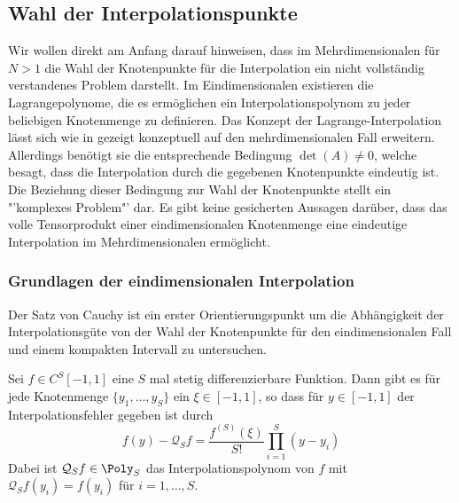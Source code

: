 \subsection{Wahl der Interpolationspunkte}
\label{chapter:interpolation_points}
Wir wollen direkt am Anfang darauf hinweisen, dass im Mehrdimensionalen für $N>1$ die Wahl der Knotenpunkte für die Interpolation ein nicht vollständig verstandenes Problem darstellt. Im Eindimensionalen existieren die Lagrangepolynome, die es ermöglichen ein Interpolationspolynom zu jeder beliebigen Knotenmenge zu definieren. Das Konzept der Lagrange-Interpolation lässt sich wie in \autocite{San07} gezeigt konzeptuell auf den mehrdimensionalen Fall erweitern. Allerdings benötigt sie die entsprechende Bedingung $\det(A)\neq 0$, welche besagt, dass die Interpolation durch die gegebenen Knotenpunkte eindeutig ist. Die Beziehung dieser Bedingung zur Wahl der Knotenpunkte stellt ein "'komplexes Problem"' dar. Es gibt keine gesicherten Aussagen darüber, dass das volle Tensorprodukt einer eindimensionalen Knotenmenge eine eindeutige Interpolation im Mehrdimensionalen ermöglicht.
\subsubsection*{Grundlagen der eindimensionalen Interpolation}
Der Satz von Cauchy ist ein erster Orientierungspunkt um die Abhängigkeit der Interpolationsgüte von der Wahl der Knotenpunkte für den eindimensionalen Fall und einem kompakten Intervall zu untersuchen.
\begin{maththeorem}[Cauchy]
Sei $f\in C^{S}[-1,1]$ eine $S$ mal stetig differenzierbare Funktion. Dann gibt es für jede Knotenmenge $\lbrace y_1,\dots,y_{S}\rbrace$ ein $\xi\in [-1,1]$, so dass für $y\in[-1,1]$ der Interpolationsfehler gegeben ist durch
\[f(y)-\mathcal{Q}_{S}f=\frac{f^{(S)}(\xi)}{S!}\prod_{i=1}^{S}(y-y_i)\]
Dabei ist $\mathcal{Q}_Sf\in\Poly_S$ das Interpolationspolynom von $f$ mit $\mathcal{Q}_Sf(y_i)=f(y_i)$ für $i=1,\dots,S$.
\end{maththeorem}

